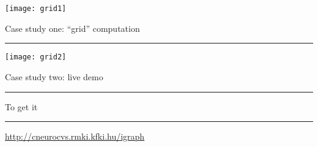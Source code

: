 \documentclass[landscape,20pt]{foils}
\newcommand{\tit}[1]{{\centering\Large #1\par\vspace*{10pt}\hrule}}
\begin{document}
\begin{center}
\texttt{[image: grid1]}
\end{center}

\newpage

\tit{Case study one: ``grid'' computation}

\begin{center}
\texttt{[image: grid2]}
\end{center}

\newpage

\tit{Case study two: live demo}

\newpage

\tit{To get it}

\vfill
\begin{center}
\Large
\url{http://cneurocvs.rmki.kfki.hu/igraph}
\end{center}
\vfill
\end{document}
